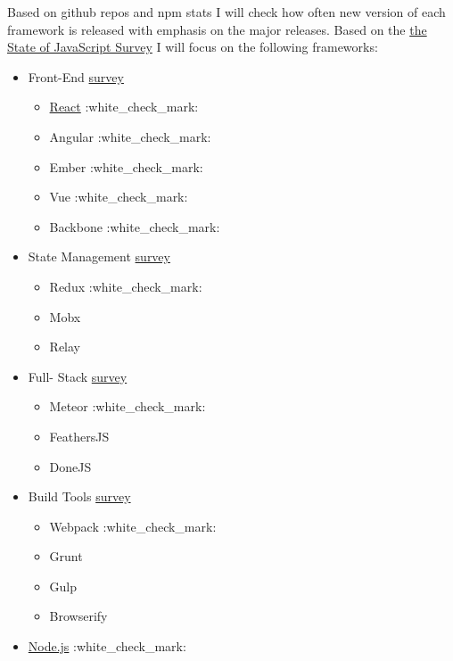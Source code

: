 Based on github repos and npm stats I will check how often new version
of each framework is released with emphasis on the major releases. Based
on the \href{http://stateofjs.com/}{the State of JavaScript Survey} I
will focus on the following frameworks:

\begin{itemize}
\tightlist
\item
  Front-End \href{http://stateofjs.com/2016/frontend/}{survey}

  \begin{itemize}
  \tightlist
  \item
    \protect\hyperlink{react}{React} :white\_check\_mark:
  \item
    Angular :white\_check\_mark:
  \item
    Ember :white\_check\_mark:
  \item
    Vue :white\_check\_mark:
  \item
    Backbone :white\_check\_mark:
  \end{itemize}
\item
  State Management
  \href{http://stateofjs.com/2016/statemanagement/}{survey}

  \begin{itemize}
  \tightlist
  \item
    Redux :white\_check\_mark:
  \item
    Mobx
  \item
    Relay
  \end{itemize}
\item
  Full- Stack \href{http://stateofjs.com/2016/fullstack/}{survey}

  \begin{itemize}
  \tightlist
  \item
    Meteor :white\_check\_mark:
  \item
    FeathersJS
  \item
    DoneJS
  \end{itemize}
\item
  Build Tools \href{http://stateofjs.com/2016/buildtools/}{survey}

  \begin{itemize}
  \tightlist
  \item
    Webpack :white\_check\_mark:
  \item
    Grunt
  \item
    Gulp
  \item
    Browserify
  \end{itemize}
\item
  \protect\hyperlink{nodeJS}{Node.js} :white\_check\_mark:
\end{itemize}

